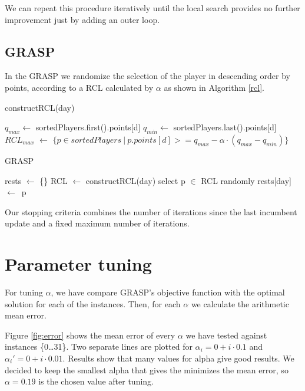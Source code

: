 \documentclass[a4paper, 10pt]{article}
\begin{document}
We can repeat this procedure iteratively until the local search provides no further improvement just by adding an outer loop.


\clearpage
\subsection{GRASP}

In the GRASP we randomize the selection of the player in descending order by points, according to a RCL calculated by $\alpha$ as shown in Algorithm \ref{rcl}.


\begin{algorithm}
    \caption{constructRCL(day)} 
    \label{rcl}
    \begin{algorithmic}[1]
	\State $q_{max} \leftarrow $ sortedPlayers.first().points[d]
	\State $q_{min} \leftarrow$ sortedPlayers.last().points[d]
	\State $RCL_{max}$ $\leftarrow$ $\{p \in sortedPlayers\ |\ p.points[d] >= q_{max} - \alpha \cdot (q_{max} - q_{min})\}$
    \end{algorithmic} 
\end{algorithm}




\begin{algorithm}
	\caption{GRASP} 
	\begin{algorithmic}[1]
	  \State rests $\leftarrow$ \{\}
	      \State RCL $\leftarrow$ constructRCL(day)
	      \State select p $\in$ RCL randomly
	      \State rests[day]\ $\leftarrow$\ p
	    \EndFor
	\end{algorithmic} 
\end{algorithm}

Our stopping criteria combines the number of iterations since the last incumbent update and a fixed maximum number of iterations.


\section{Parameter tuning} 

For tuning $\alpha$, we have compare GRASP's objective function with the optimal solution for each of the instances. Then, for each $\alpha$ we calculate the arithmetic mean error. 

Figure \ref{fig:error} shows the mean error of every $\alpha$ we have tested against instances \{0\dots31\}. Two separate lines are plotted for $\alpha_i = 0 + i \cdot 0.1$ and $\alpha_i' = 0 + i \cdot 0.01$. Results show that many values for alpha give good results. We decided to keep the smallest alpha that gives the minimizes the mean error, so $\alpha = 0.19$ is the chosen value after tuning.
\end{document}
